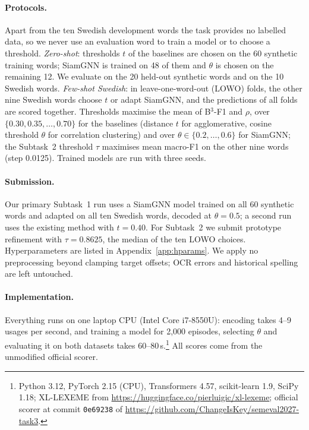 \documentclass[11pt]{article}
\newcommand{\sys}{SiamGNN\xspace}
\newcommand{\xll}{XL-LEXEME\xspace}
\newcommand{\bcubed}{B$^3$-F1\xspace}
\begin{document}
\paragraph{Protocols.}
Apart from the ten Swedish development words the task provides no labelled data, so we never use an evaluation word to train a model or to choose a threshold. \emph{Zero-shot}: thresholds $t$ of the baselines are chosen on the 60 synthetic training words; \sys is trained on 48 of them and $\theta$ is chosen on the remaining 12. We evaluate on the 20 held-out synthetic words and on the 10 Swedish words. \emph{Few-shot Swedish}: in leave-one-word-out (LOWO) folds, the other nine Swedish words choose $t$ or adapt \sys, and the predictions of all folds are scored together. Thresholds maximise the mean of \bcubed and $\rho$, over $\{0.30,0.35,\dots,0.70\}$ for the baselines (distance $t$ for agglomerative, cosine threshold $\theta$ for correlation clustering) and over $\theta\in\{0.2,\dots,0.6\}$ for \sys; the Subtask~2 threshold $\tau$ maximises mean macro-F1 on the other nine words (step 0.0125). Trained models are run with three seeds.

\paragraph{Submission.}
Our primary Subtask~1 run uses a \sys model trained on all 60 synthetic words and adapted on all ten Swedish words, decoded at $\theta=0.5$; a second run uses the existing method with $t=0.40$. For Subtask~2 we submit prototype refinement with $\tau=0.8625$, the median of the ten LOWO choices. Hyperparameters are listed in Appendix~\ref{app:hparams}. We apply no preprocessing beyond clamping target offsets; OCR errors and historical spelling are left untouched.

\paragraph{Implementation.}
Everything runs on one laptop CPU (Intel Core i7-8550U): encoding takes 4--9 usages per second, and training a model for 2,000 episodes, selecting $\theta$ and evaluating it on both datasets takes 60--80\,s.\footnote{Python 3.12, PyTorch 2.15 (CPU), Transformers 4.57, scikit-learn 1.9, SciPy 1.18; \xll from \url{https://huggingface.co/pierluigic/xl-lexeme}; official scorer at commit \texttt{0e69238} of \url{https://github.com/ChangeIsKey/semeval2027-task3}.} All scores come from the unmodified official scorer.
\end{document}
